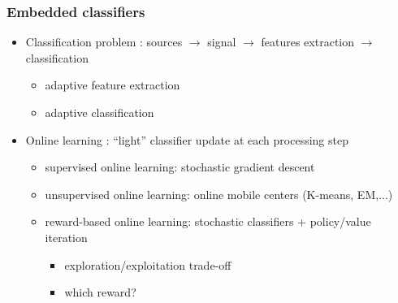\documentclass{beamer}
\begin{document}
\begin{frame}\frametitle{Embedded classifiers}
	\begin{itemize}
		\item Classification problem : sources $\rightarrow$ signal $\rightarrow$ features extraction $\rightarrow$ classification
		\begin{itemize}
			\item adaptive feature extraction
			\item adaptive classification
		\end{itemize}
		\item Online learning : ``light'' classifier update at each processing step
		\begin{itemize}
			\item supervised online learning: stochastic gradient descent
			\item unsupervised online learning: online mobile centers (K-means, EM,...) 
			\item reward-based online learning: stochastic classifiers + policy/value iteration 
			\begin{itemize}
				\item exploration/exploitation trade-off
				\item which reward?
			\end{itemize}
		\end{itemize}
	\end{itemize}
\end{frame}
\end{document}
